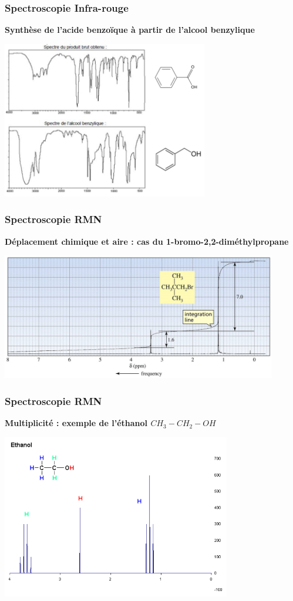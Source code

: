 \documentclass{beamer}
\begin{document}
\begin{frame}
\frametitle{Spectroscopie Infra-rouge}
\textbf{Synthèse de l'acide benzoïque à partir de l'alcool benzylique}\\
\vspace{0.4cm}
\centerline{\includegraphics[width=9cm]{spectresIR}}
\end{frame}

\begin{frame}
\frametitle{Spectroscopie RMN}
\textbf{Déplacement chimique et aire : cas du 1-bromo-2,2-diméthylpropane}\\
\vspace{0.4cm}
\centerline{\includegraphics[width=12cm]{spectreRMN1}}
\end{frame}

\begin{frame}
\frametitle{Spectroscopie RMN}
\textbf{Multiplicité : exemple de l'éthanol $CH_3-CH_2-OH$}\\
\vspace{0.3cm}
\centerline{\includegraphics[width=10cm]{RMN2_0}}
\end{frame}
\end{document}
